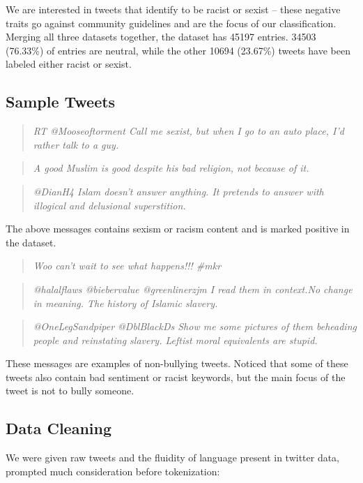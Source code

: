 \documentclass[conference]{IEEEtran}
\begin{document}
We are interested in tweets that identify to be racist or sexist -- these negative traits go against community guidelines and are the focus of our classification. Merging all three datasets together, the dataset has 45197 entries. 34503 (76.33\%) of entries are neutral, while the other 10694 (23.67\%) tweets have been labeled either racist or sexist.

\subsection{Sample Tweets}
\begin{quotation}
\emph{RT @Mooseoftorment Call me sexist, but when I go to an auto place, I'd rather talk to a guy.}
\end{quotation}
\begin{quotation}
\emph{A good Muslim is good despite his bad religion, not because of it.}
\end{quotation}
\begin{quotation}
\emph{@DianH4 Islam doesn't answer anything.  It pretends to answer with illogical and delusional superstition.}
\end{quotation}

The above messages contains sexism or racism content and is marked positive in the dataset.

\begin{quotation}
\emph{Woo can't wait to see what happens!!! \#mkr}
\end{quotation}
\begin{quotation}
\emph{@halalflaws @biebervalue @greenlinerzjm I read them in context.No change in meaning. The history of Islamic slavery.}
\end{quotation}
\begin{quotation}
\emph{@OneLegSandpiper @DblBlackDs Show me some pictures of them beheading people and reinstating slavery. Leftist moral equivalents are stupid.}
\end{quotation}

These messages are examples of non-bullying tweets. Noticed that some of these tweets also contain bad sentiment or racist keywords, but the main focus of the tweet is not to bully someone.

\subsection{Data Cleaning }

We were given raw tweets and the fluidity of language present in twitter data, prompted much consideration before tokenization:
\end{document}
